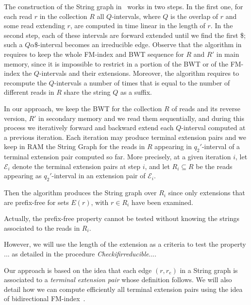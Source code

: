 \documentclass[runningheads,envcountsame,a4paper]{llncs}
\newcommand{\notaestesa}[2]{%
  {\sffamily {\bfseries #1}{\footnotesize #2}}%
  \marginpar{\framebox{\Large *}}%
}
\begin{document}
The construction of the String graph in~\cite{Simpson2010} works in two
steps.
In the first one, for each read $r$ in the collection $R$ all
$Q$-intervals, where $Q$ is the overlap of $r$ and some read extending $r$,
are computed in time linear in
the  length of $r$.
In the second step, each of these intervals are forward extended until
we find the first \$; such a $Q\alpha\$$-interval becomes an
irreducible edge.
Observe that the algorithm  in~\cite{Simpson2010} requires to keep the whole FM-index
and BWT sequence for $R$ and $R'$ in main memory, since it is impossible to
restrict in a portion of the BWT or of the FM-index the $Q$-intervals
and their extensions.
Moreover, the algorithm requires to recompute the $Q$-intervals a number of
times that is equal to the number of different reads in $R$ share the
string $Q$ as a suffix.\notaestesa{GDV}{ perchè?}


In our approach, we keep the BWT for the collection $R$ of reads and its
reverse version, $R'$ in secondary memory and we read them sequentially,
and during this process we iteratively forward and backward extend each
$Q$-interval computed at a previous iteration.
Each iteration may produce terminal extension pairs and we keep in RAM
the String Graph for the reads in $R$ appearing in
$q_{2}'$-interval of a terminal extension pair computed so far.
More precisely, at a given iteration $i$, let $\mathcal{E}_i$ denote the
terminal extension pairs at step $i$, and let $R_i\subseteq R$ be the reads
appearing as $q_{2}'$-interval  in an extension pair of $\mathcal{E}_i$.
\notaestesa{GDV}{ Non capisco le prossime due frasi}
Then the algorithm produces the String graph over $R_i$ since only
extensions that are prefix-free for sets $E(r)$, with $r \in R_i$ have
been examined.

Actually, the prefix-free property cannot be tested without knowing the
strings associated to the reads in $R_i$.

 However, we will use the length of the extension as a criteria to test
the property ... as detailed in the procedure
\emph{Checkifirreducible}....


Our approach is based on the idea that each edge $(r, r_e)$ in a String graph is
associated to a \emph{terminal extension pair} whose definition follows.
We will also detail how we can compute efficiently all terminal extension pairs
using the idea of bidirectional FM-index~\cite{Lam2009}.
\end{document}
